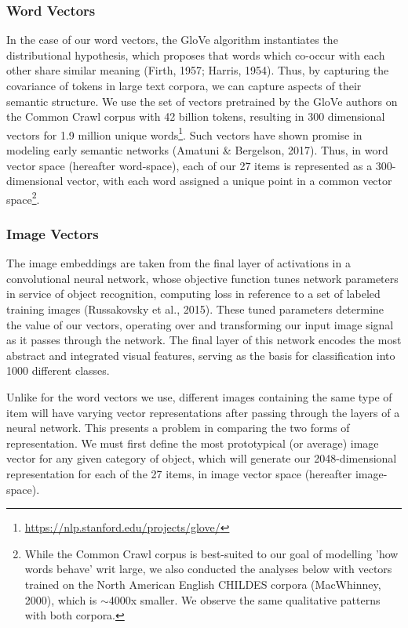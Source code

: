 \documentclass[10pt, letterpaper]{article}
\begin{document}
\subsubsection{Word Vectors}\label{word-vectors}

In the case of our word vectors, the GloVe algorithm instantiates the
distributional hypothesis, which proposes that words which co-occur with
each other share similar meaning (Firth, 1957; Harris, 1954). Thus, by
capturing the covariance of tokens in large text corpora, we can capture
aspects of their semantic structure. We use the set of vectors
pretrained by the GloVe authors on the Common Crawl corpus with 42
billion tokens, resulting in 300 dimensional vectors for 1.9 million
unique words\footnote{\url{https://nlp.stanford.edu/projects/glove/}}.
Such vectors have shown promise in modeling early semantic networks
(Amatuni \& Bergelson, 2017). Thus, in word vector space (hereafter
word-space), each of our 27 items is represented as a 300-dimensional
vector, with each word assigned a unique point in a common vector
space\footnote{While the Common Crawl corpus is best-suited to our goal of modelling 'how words behave' writ large, we also conducted the analyses below with vectors trained on the North American English CHILDES corpora (MacWhinney, 2000), which is $\sim$4000x smaller. We observe the same qualitative patterns with both corpora.}.

\subsubsection{Image Vectors}\label{image-vectors}

The image embeddings are taken from the final layer of activations in a
convolutional neural network, whose objective function tunes network
parameters in service of object recognition, computing loss in reference
to a set of labeled training images (Russakovsky et al., 2015). These
tuned parameters determine the value of our vectors, operating over and
transforming our input image signal as it passes through the network.
The final layer of this network encodes the most abstract and integrated
visual features, serving as the basis for classification into 1000
different classes.

Unlike for the word vectors we use, different images containing the same
type of item will have varying vector representations after passing
through the layers of a neural network. This presents a problem in
comparing the two forms of representation. We must first define the most
prototypical (or average) image vector for any given category of object,
which will generate our 2048-dimensional representation for each of the
27 items, in image vector space (hereafter image-space).
\end{document}
